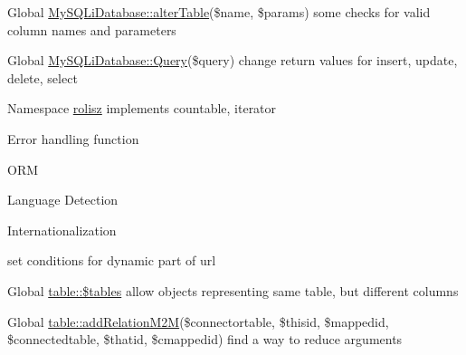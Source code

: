 \label{todo__todo000003}
\hypertarget{todo__todo000003}{}
 
\begin{DoxyDescription}
\item[Global \hyperlink{class_my_s_q_li_database_aa8cf3e2be109e548bed6980622fffb41}{MySQLiDatabase::alterTable}(\$name, \$params) ]some checks for valid column names and parameters
\end{DoxyDescription}

\label{todo__todo000002}
\hypertarget{todo__todo000002}{}
 
\begin{DoxyDescription}
\item[Global \hyperlink{class_my_s_q_li_database_aebc962126fd37fd3478c4689156d5f83}{MySQLiDatabase::Query}(\$query) ]change return values for insert, update, delete, select 
\end{DoxyDescription}

\label{todo__todo000001}
\hypertarget{todo__todo000001}{}
 
\begin{DoxyDescription}
\item[Namespace \hyperlink{namespacerolisz}{rolisz} ]implements countable, iterator 

Error handling function 

ORM 

Language Detection 

Internationalization 

set conditions for dynamic part of url 
\end{DoxyDescription}

\label{todo__todo000004}
\hypertarget{todo__todo000004}{}
 
\begin{DoxyDescription}
\item[Global \hyperlink{classtable_a3d332a3c374a53802495dcb045f6133f}{table::\$tables} ]allow objects representing same table, but different columns 
\end{DoxyDescription}

\label{todo__todo000005}
\hypertarget{todo__todo000005}{}
 
\begin{DoxyDescription}
\item[Global \hyperlink{classtable_a29c2012e7cc6b182cc3ca63acfc324b9}{table::addRelationM2M}(\$connectortable, \$thisid, \$mappedid, \$connectedtable, \$thatid, \$cmappedid) ]find a way to reduce arguments
\end{DoxyDescription}

